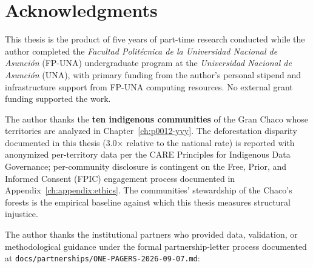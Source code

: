%
%
%

\chapter*{Acknowledgments}

This thesis is the product of five years of part-time research
conducted while the author completed the \textit{Facultad
Politécnica de la Universidad Nacional de Asunción} (FP-UNA) undergraduate program at the
\textit{Universidad Nacional de Asunción} (UNA), with primary
funding from the author's personal stipend and infrastructure
support from FP-UNA computing resources. No external grant
funding supported the work.

The author thanks the \textbf{ten indigenous communities} of the
Gran Chaco whose territories are analyzed in
Chapter~\ref{ch:p0012-yvy}. The deforestation disparity documented
in this thesis (3.0$\times$ relative to the national rate) is
reported with anonymized per-territory data per the CARE
Principles for Indigenous Data Governance; per-community
disclosure is contingent on the Free, Prior, and Informed Consent
(FPIC) engagement process documented in
Appendix~\ref{ch:appendix:ethics}. The communities' stewardship of
the Chaco's forests is the empirical baseline against which this
thesis measures structural injustice.

The author thanks the institutional partners who provided data,
validation, or methodological guidance under the formal
partnership-letter process documented at
\texttt{docs/partnerships/ONE-PAGERS-2026-09-07.md}:

